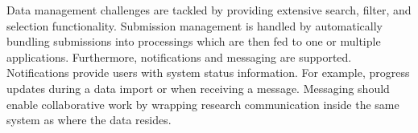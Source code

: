 Data management challenges are tackled by providing extensive search, filter, and selection functionality.
Submission management is handled by automatically bundling submissions into processings which are then fed to one or multiple applications.
Furthermore, notifications and messaging are supported.
Notifications provide users with system status information. 
For example, progress updates during a data import or when receiving a message.
Messaging should enable collaborative work by wrapping research communication inside the same system as where the data resides.
